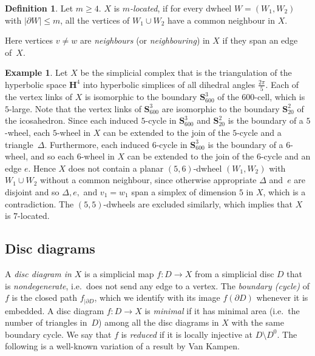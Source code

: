 \documentclass[a4paper,12pt,leqno]{amsart}
\theoremstyle{definition}
\newtheorem{defn}[thm]{Definition}
\newtheorem{example}[thm]{Example}
\newcommand{\Hp}{\mathbf{H}}
\newcommand{\Sp}{\mathbf{S}}
\begin{document}
\begin{defn}
    Let $m\geq 4$. $X$ is \emph{$m$-located}, if for every dwheel $W=(W_1,W_2)$ with $|\partial W|\leq m$, all the vertices of $W_1\cup W_2$ have a common neighbour in $X$. 
\end{defn}

Here vertices $v\neq w$ are \emph{neighbours} (or \emph{neighbouring}) in $X$  if they span an edge of~$X$.

\begin{example}
Let $X$ be the simplicial complex that is the triangulation of the hyperbolic space $\Hp^4$ into hyperbolic simplices of all dihedral angles $\frac{2\pi}{5}$. Each of the vertex links of $X$ is isomorphic to the boundary $\Sp^3_{600}$ of the $600$-cell, which is $5$-large.
Note that the vertex links of $\Sp^3_{600}$ are isomorphic to the boundary $\Sp^2_{20}$ of the icosahedron. Since each induced $5$-cycle in $\Sp^3_{600}$ and $\Sp^2_{20}$ is the boundary of a $5$-wheel, each $5$-wheel in $X$ can be extended to the join of the $5$-cycle and a triangle~$\Delta$. Furthermore, each induced $6$-cycle in $\Sp^3_{600}$ is the boundary of a $6$-wheel, and so each $6$-wheel in $X$ can be extended to the join of the $6$-cycle and an edge $e$. Hence $X$ does not contain a planar $(5,6)$-dwheel $(W_1,W_2)$ with $W_1\cup W_2$ without a common neighbour, since otherwise appropriate $\Delta$ and~$e$ are disjoint and so $\Delta,e,$ and $v_1=w_1$ span a simplex of dimension $5$ in $X$, which is a contradiction. The $(5,5)$-dwheels are excluded similarly, which implies that $X$ is $7$-located.
\end{example}


\subsection{Disc diagrams}
\label{subsec:discdiagram}
 
A \emph{disc diagram in $X$} is a simplicial map $f\colon D\to X$ from a simplicial disc $D$ that is \emph{nondegenerate}, i.e.\ does not send any edge to a vertex. The \emph{boundary (cycle)} of $f$ is the closed path $f_{|\partial D}$, which we identify with its image $f(\partial D)$ whenever it is embedded. A disc diagram $f\colon D\to X$ is \emph{minimal} if it has minimal area (i.e.\ the number of triangles in~$D$) among all the disc diagrams in $X$ with the same boundary cycle. We say that $f$ is \emph{reduced} if it is locally injective at $D\setminus D^{0}$. The following is a well-known variation of a result by Van Kampen. 
\end{document}
